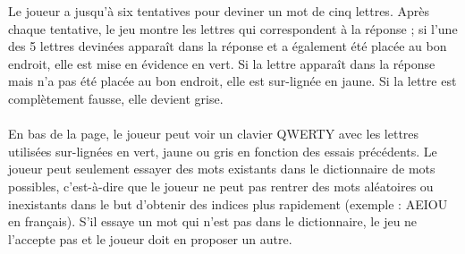 \tabto{1cm}Le joueur a  jusqu'à six tentatives pour deviner un mot de cinq lettres. Après chaque tentative, le jeu montre les lettres qui correspondent à la réponse ; si l'une des 5 lettres devinées apparaît dans la réponse et a également été placée au bon endroit, elle est mise en évidence en vert. Si la lettre apparaît dans la réponse mais n'a pas été placée au bon endroit, elle est sur-lignée en jaune. Si la lettre est complètement fausse, elle devient grise. \\ \\
\tabto{1cm}En bas de la page, le joueur peut voir un clavier QWERTY avec les lettres utilisées sur-lignées en vert, jaune ou gris en fonction des essais précédents. Le joueur peut seulement essayer des mots existants dans le dictionnaire de mots possibles, c'est-à-dire que le joueur ne peut pas rentrer des mots aléatoires ou inexistants dans le but d'obtenir des indices plus rapidement (exemple : AEIOU en français). S’il essaye un mot qui n’est pas dans le dictionnaire, le jeu ne l’accepte pas et le joueur doit en proposer un autre.

\tabto{1cm}

